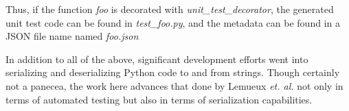 Thus, if the function \textit{foo} is decorated with \textit{unit\_test\_decorator},
the generated unit test code can be found in \textit{test\_foo.py}, and the 
metadata can be found in a JSON file name named \textit{foo.json}

In addition to all of the above, significant development efforts went into 
serializing and deserializing Python code to and from strings.  Though
certainly not a panecea, the work here advances that done by 
Lemueux \textit{et. al.} \cite{lemieux2023codamosa} not only in terms of 
automated testing but also in terms of serialization capabilities.


